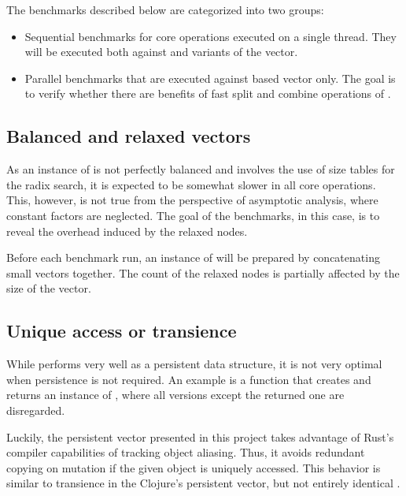 
The benchmarks described below are categorized into two groups:
\begin{itemize}
    \item Sequential benchmarks for core operations executed on a single thread. They will be executed both against \rc{} and \arc{} variants of the vector.
    \item Parallel benchmarks that are executed against \arc{} based vector only. The goal is to verify whether there are benefits of fast split and combine operations of \rrbvec{}.
\end{itemize}

\subsection{Balanced and relaxed vectors}
As an instance of \rrbtree{} is not perfectly balanced and involves the use of size tables for the radix search, it is expected to be somewhat slower in all core operations. This, however, is not true from the perspective of asymptotic analysis, where constant factors are neglected. The goal of the benchmarks, in this case, is to reveal the overhead induced by the relaxed nodes.

Before each benchmark run, an instance of \rrbvec{} will be prepared by concatenating small vectors together. The count of the relaxed nodes is partially affected by the size of the vector.

\subsection{Unique access or transience}
While \rrbvec{} performs very well as a persistent data structure, it is not very optimal when persistence is not required. An example is a function that creates and returns an instance of \rrbvec{}, where all versions except the returned one are disregarded.

Luckily, the persistent vector presented in this project takes advantage of Rust's compiler capabilities of tracking object aliasing. Thus, it avoids redundant copying on mutation if the given object is uniquely accessed. This behavior is similar to transience in the Clojure's persistent vector, but not entirely identical \cite{improving-performance-through-transience}.

